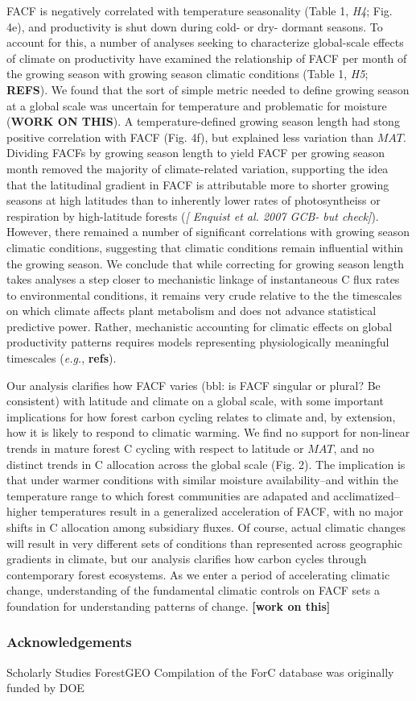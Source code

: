 \documentclass[]{article}
\begin{document}
FACF is negatively correlated with temperature seasonality (Table 1,
\emph{H4}; Fig. 4e), and productivity is shut down during cold- or dry-
dormant seasons. To account for this, a number of analyses seeking to
characterize global-scale effects of climate on productivity have
examined the relationship of FACF per month of the growing season with
growing season climatic conditions (Table 1, \emph{H5}; \textbf{REFS}).
We found that the sort of simple metric needed to define growing season
at a global scale was uncertain for temperature and problematic for
moisture (\textbf{WORK ON THIS}). A temperature-defined growing season
length had stong positive correlation with FACF (Fig. 4f), but explained
less variation than \(MAT\). Dividing FACFs by growing season length to
yield FACF per growing season month removed the majority of
climate-related variation, supporting the idea that the latitudinal
gradient in FACF is attributable more to shorter growing seasons at high
latitudes than to inherently lower rates of photosyntheiss or
respiration by high-latitude forests (\emph{{[} Enquist et al. 2007 GCB-
but check{]}}). However, there remained a number of significant
correlations with growing season climatic conditions, suggesting that
climatic conditions remain influential within the growing season. We
conclude that while correcting for growing season length takes analyses
a step closer to mechanistic linkage of instantaneous C flux rates to
environmental conditions, it remains very crude relative to the the
timescales on which climate affects plant metabolism and does not
advance statistical predictive power. Rather, mechanistic accounting for
climatic effects on global productivity patterns requires models
representing physiologically meaningful timescales (\emph{e.g.},
\textbf{refs}).

Our analysis clarifies how FACF varies (bbl: is FACF singular or plural?
Be consistent) with latitude and climate on a global scale, with some
important implications for how forest carbon cycling relates to climate
and, by extension, how it is likely to respond to climatic warming. We
find no support for non-linear trends in mature forest C cycling with
respect to latitude or \(MAT\), and no distinct trends in C allocation
across the global scale (Fig. 2). The implication is that under warmer
conditions with similar moisture availability--and within the
temperature range to which forest communities are adapated and
acclimatized--higher temperatures result in a generalized acceleration
of FACF, with no major shifts in C allocation among subsidiary fluxes.
Of course, actual climatic changes will result in very different sets of
conditions than represented across geographic gradients in climate, but
our analysis clarifies how carbon cycles through contemporary forest
ecosystems. As we enter a period of accelerating climatic change,
understanding of the fundamental climatic controls on FACF sets a
foundation for understanding patterns of change. \textbf{{[}work on
this{]}}

\subsubsection{Acknowledgements}\label{acknowledgements}

Scholarly Studies ForestGEO Compilation of the ForC database was
originally funded by DOE


\end{document}
